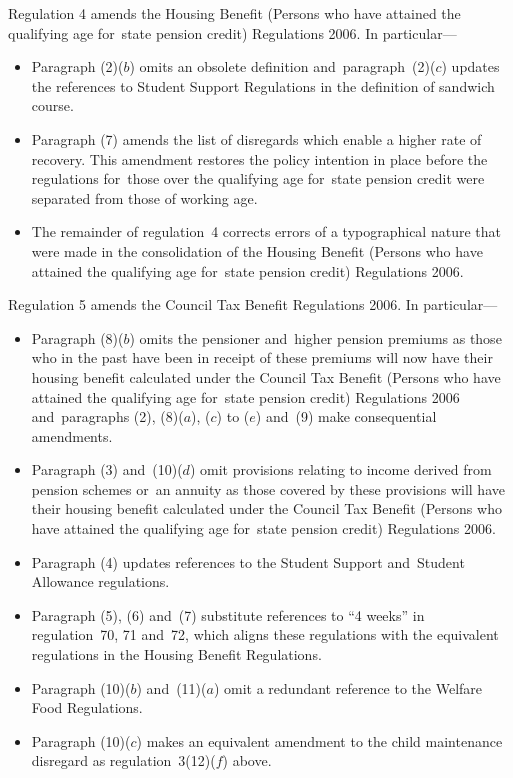 \documentclass[12pt,a4paper]{article}
\begin{document}
Regulation 4 amends the Housing Benefit (Persons who have attained the qualifying age for~state pension credit) Regulations 2006. In particular---
\begin{itemize}
\item
    Paragraph (2)($b$)  omits an obsolete definition and~paragraph~(2)($c$)  updates the references to Student Support Regulations in the definition of sandwich course.

\item
    Paragraph (7) amends the list of disregards which enable a higher rate of recovery. This amendment restores the policy intention in place before the regulations for~those over the qualifying age for~state pension credit were separated from those of working age.

\item
    The remainder of regulation~4 corrects errors of a typographical nature that were made in the consolidation of the Housing Benefit (Persons who have attained the qualifying age for~state pension credit) Regulations 2006. 
\end{itemize}

Regulation 5 amends the Council Tax Benefit Regulations 2006. In particular---
\begin{itemize}
\item
    Paragraph (8)($b$)  omits the pensioner and~higher pension premiums as those who in the past have been in receipt of these premiums will now have their housing benefit calculated under the Council Tax Benefit (Persons who have attained the qualifying age for~state pension credit) Regulations 2006 and~paragraphs (2), (8)($a$), ($c$)  to ($e$)  and~(9) make consequential amendments.

\item
    Paragraph (3) and~(10)($d$)  omit provisions relating to income derived from pension schemes or~an annuity as those covered by these provisions will have their housing benefit calculated under the Council Tax Benefit (Persons who have attained the qualifying age for~state pension credit) Regulations 2006.

\item
    Paragraph (4) updates references to the Student Support and~Student Allowance regulations.

\item
    Paragraph (5), (6) and~(7) substitute references to “4 weeks” in regulation~70, 71 and~72, which aligns these regulations with the equivalent regulations in the Housing Benefit Regulations.

\item
    Paragraph (10)($b$)  and~(11)($a$)  omit a redundant reference to the Welfare Food Regulations.

\item
    Paragraph (10)($c$)  makes an equivalent amendment to the child maintenance disregard as regulation~3(12)($f$)  above. 
\end{itemize}
\end{document}
